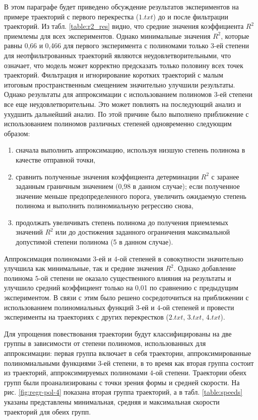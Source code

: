 В этом параграфе будет приведено обсуждение результатов экспериментов на примере траекторий с первого перекрестка ($ 1.txt $) до и после фильтрации траекторий. Из табл. \ref{table:r2_res} видно, что средние значения коэффициента $R^2$ приемлемы для всех экспериментов. Однако минимальные значения $R^2$, которые равны 0,66 и 0,466 для первого эксперимента с полиномами только $3$-ей степени для неотфильтрованных траекторий являются неудовлетворительными, что означает, что модель может корректно предсказать только половину всех точек траекторий. Фильтрация и игнорирование коротких траекторий с малым итоговым пространственным смещением значительно улучшили результаты. Однако результаты для аппроксимации с использованием полиномов $3$-ей степени все еще неудовлетворительны. Это может повлиять на последующий анализ и ухудшить дальнейший анализ. По этой причине было выполнено приближение с использованием полиномов различных степеней одновременно следующим образом:

\begin{enumerate}
	\item сначала выполнить аппроксимацию, используя низшую степень полинома в качестве отправной точки,
	\item сравнить полученные значения коэффициента детерминации $R^2$ с заранее заданным граничным значением (0,98 в данном случае); если полученное значение меньше предопределенного порога, увеличить ожидаемую степень полинома и выполнить полиномиальную регрессию снова,
	\item продолжать увеличивать степень полинома до получения приемлемых значений $R^2$ или до достижения заданного ограничения максимальной допустимой степени полинома (5 в данном случае). 
\end{enumerate} 

Аппроксимация полиномами $3$-ей и $4$-ой степеней в совокупности значительно улучшила как минимальные, так и средние значения $R^2$. Однако добавление полинома $5$-ой степени не оказало существенного влияния на результаты и улучшило средний коэффициент только на 0,01 по сравнению с предыдущим экспериментом. В связи с этим было решено сосредоточиться на приближении с использованием полиномиальных функций $3$-ей и $4$-ой степеней и провести эксперименты на траекториях с других перекрестков ($2.txt$, $3.txt$, $4.txt$).

Для упрощения повествования траектории будут классифицированы на две группы в зависимости от степени полиномов, использованных для аппроксимации: первая группа включает в себя траектории, аппроксимированные полиномиальными функциями $3$-ей степени, в то время как вторая группа состоит из траекторий, аппроксимируемых полиномами $4$-ой степени. Траектории обеих групп были проанализированы с точки зрения формы и средней скорости. На рис. \ref{fig:regr-pol-4} показана вторая группа траекторий, а в табл. \ref{table:speeds} указаны представлены минимальная, средняя и максимальная скорости траекторий для обеих групп.

